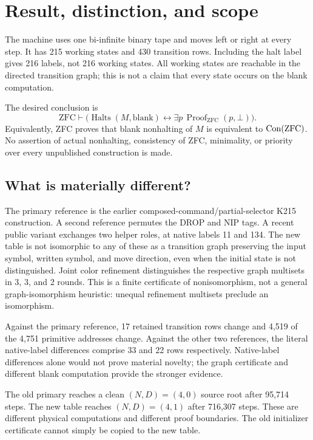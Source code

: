 \section{Result, distinction, and scope}
The machine uses one bi-infinite binary tape and moves left or right at every step. It has 215 working states and 430 transition rows. Including the halt label gives 216 labels, not 216 working states. All working states are reachable in the directed transition graph; this is not a claim that every state occurs on the blank computation.

The desired conclusion is
\[
\mathrm{ZFC}\vdash
\bigl(\operatorname{Halts}(M,\mathrm{blank})
\leftrightarrow\exists p\,\operatorname{Proof}_{\mathrm{ZFC}}(p,\bot)\bigr).
\]
Equivalently, ZFC proves that blank nonhalting of $M$ is equivalent to $\operatorname{Con}(\mathrm{ZFC})$. No assertion of actual nonhalting, consistency of ZFC, minimality, or priority over every unpublished construction is made.

\subsection{What is materially different?}
The primary reference is the earlier composed-command/partial-selector K215 construction. A second reference permutes the DROP and NIP tags. A recent public variant exchanges two helper roles, at native labels 11 and 134. The new table is not isomorphic to any of these as a transition graph preserving the input symbol, written symbol, and move direction, even when the initial state is not distinguished. Joint color refinement distinguishes the respective graph multisets in 3, 3, and 2 rounds. This is a finite certificate of nonisomorphism, not a general graph-isomorphism heuristic: unequal refinement multisets preclude an isomorphism.

Against the primary reference, 17 retained transition rows change and 4,519 of the 4,751 primitive addresses change. Against the other two references, the literal native-label differences comprise 33 and 22 rows respectively. Native-label differences alone would not prove material novelty; the graph certificate and different blank computation provide the stronger evidence.

The old primary reaches a clean $(N,D)=(4,0)$ source root after 95,714 steps. The new table reaches $(N,D)=(4,1)$ after 716,307 steps. These are different physical computations and different proof boundaries. The old initializer certificate cannot simply be copied to the new table.

